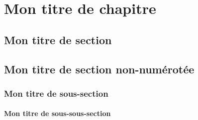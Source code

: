 \chapter{Mon titre de chapitre}  %
\section{Mon titre de section}
\section*{Mon titre de section non-numérotée}   
\subsection[Plus petit titre]{Mon titre de sous-section}
\subsubsection{Mon titre de sous-sous-section}  
\paragraph{}    %
